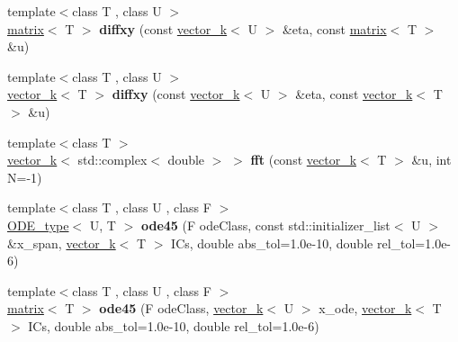 \begin{DoxyCompactItemize}
\item 
\hypertarget{namespacekeycpp_aae3bec60fc5a78f2c532ea1d1ad1d336}{{\footnotesize template$<$class T , class U $>$ }\\\hyperlink{classkeycpp_1_1matrix}{matrix}$<$ T $>$ {\bfseries diffxy} (const \hyperlink{classkeycpp_1_1vector__k}{vector\-\_\-k}$<$ U $>$ \&eta, const \hyperlink{classkeycpp_1_1matrix}{matrix}$<$ T $>$ \&u)}\label{namespacekeycpp_aae3bec60fc5a78f2c532ea1d1ad1d336}

\item 
\hypertarget{namespacekeycpp_aa2cab711aeb1a50fe342f7c01f9e0d74}{{\footnotesize template$<$class T , class U $>$ }\\\hyperlink{classkeycpp_1_1vector__k}{vector\-\_\-k}$<$ T $>$ {\bfseries diffxy} (const \hyperlink{classkeycpp_1_1vector__k}{vector\-\_\-k}$<$ U $>$ \&eta, const \hyperlink{classkeycpp_1_1vector__k}{vector\-\_\-k}$<$ T $>$ \&u)}\label{namespacekeycpp_aa2cab711aeb1a50fe342f7c01f9e0d74}

\item 
\hypertarget{namespacekeycpp_a354a712337d461286e6202d01200d615}{{\footnotesize template$<$class T $>$ }\\\hyperlink{classkeycpp_1_1vector__k}{vector\-\_\-k}$<$ std\-::complex$<$ double $>$ $>$ {\bfseries fft} (const \hyperlink{classkeycpp_1_1vector__k}{vector\-\_\-k}$<$ T $>$ \&u, int N=-\/1)}\label{namespacekeycpp_a354a712337d461286e6202d01200d615}

\item 
\hypertarget{namespacekeycpp_aa643664371f940c36634f2ce6b843ea2}{{\footnotesize template$<$class T , class U , class F $>$ }\\\hyperlink{structkeycpp_1_1_o_d_e__type}{O\-D\-E\-\_\-type}$<$ U, T $>$ {\bfseries ode45} (F ode\-Class, const std\-::initializer\-\_\-list$<$ U $>$ \&x\-\_\-span, \hyperlink{classkeycpp_1_1vector__k}{vector\-\_\-k}$<$ T $>$ I\-Cs, double abs\-\_\-tol=1.\-0e-\/10, double rel\-\_\-tol=1.\-0e-\/6)}\label{namespacekeycpp_aa643664371f940c36634f2ce6b843ea2}

\item 
\hypertarget{namespacekeycpp_af93c8220d8d4d454f7fa57fe7db70aa2}{{\footnotesize template$<$class T , class U , class F $>$ }\\\hyperlink{classkeycpp_1_1matrix}{matrix}$<$ T $>$ {\bfseries ode45} (F ode\-Class, \hyperlink{classkeycpp_1_1vector__k}{vector\-\_\-k}$<$ U $>$ x\-\_\-ode, \hyperlink{classkeycpp_1_1vector__k}{vector\-\_\-k}$<$ T $>$ I\-Cs, double abs\-\_\-tol=1.\-0e-\/10, double rel\-\_\-tol=1.\-0e-\/6)}\label{namespacekeycpp_af93c8220d8d4d454f7fa57fe7db70aa2}


\end{DoxyCompactItemize}
